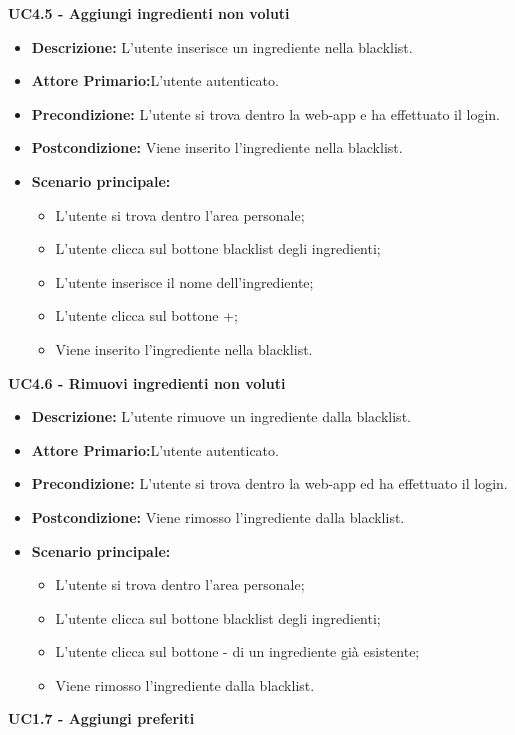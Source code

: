 \textbf{UC4.5 - Aggiungi ingredienti non voluti}
\begin{itemize}
    \item \textbf{Descrizione:} L'utente inserisce un ingrediente nella blacklist.
    \item \textbf{Attore Primario:}L'utente autenticato.
    \item \textbf{Precondizione:} L'utente si trova dentro la web-app e ha effettuato il login.
    \item \textbf{Postcondizione:} Viene inserito l'ingrediente nella blacklist.
    \item \textbf{Scenario principale:}
    \begin{itemize}
        \item L'utente si trova dentro l'area personale;
        \item L'utente clicca sul bottone blacklist degli ingredienti;
        \item L'utente inserisce il nome dell'ingrediente;
        \item L'utente clicca sul bottone +;
        \item Viene inserito l'ingrediente nella blacklist.
    \end{itemize}
\end{itemize}
\textbf{UC4.6 - Rimuovi ingredienti non voluti}
\begin{itemize}
    \item \textbf{Descrizione:} L'utente rimuove un ingrediente dalla blacklist.
    \item \textbf{Attore Primario:}L'utente autenticato.
    \item \textbf{Precondizione:} L'utente si trova dentro la web-app ed ha effettuato il login.
    \item \textbf{Postcondizione:} Viene rimosso l'ingrediente dalla blacklist.
    \item \textbf{Scenario principale:}
    \begin{itemize}
        \item L'utente si trova dentro l'area personale;
        \item L'utente clicca sul bottone blacklist degli ingredienti;
        \item L'utente clicca sul bottone - di un ingrediente già esistente;
        \item Viene rimosso l'ingrediente dalla blacklist.
    \end{itemize}
\end{itemize}
\textbf{UC1.7 - Aggiungi preferiti}
